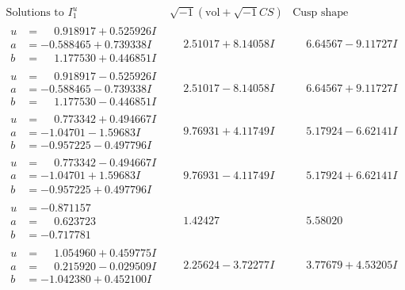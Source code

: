\documentclass[1p]{elsarticle_modified}
\theoremstyle{definition}
\newcommand{\I}{\sqrt{-1}}
\begin{document}
$$\begin{array}{c|c|c}  
\text{Solutions to }I^u_{1}& \I (\text{vol} + \sqrt{-1}CS) & \text{Cusp shape}\\
 \hline 
\begin{aligned}
u &= \phantom{-}0.918917 + 0.525926 I \\
a &= -0.588465 + 0.739338 I \\
b &= \phantom{-}1.177530 + 0.446851 I\end{aligned}
 & \phantom{-}2.51017 + 8.14058 I & \phantom{-}6.64567 - 9.11727 I \\ \hline\begin{aligned}
u &= \phantom{-}0.918917 - 0.525926 I \\
a &= -0.588465 - 0.739338 I \\
b &= \phantom{-}1.177530 - 0.446851 I\end{aligned}
 & \phantom{-}2.51017 - 8.14058 I & \phantom{-}6.64567 + 9.11727 I \\ \hline\begin{aligned}
u &= \phantom{-}0.773342 + 0.494667 I \\
a &= -1.04701 - 1.59683 I \\
b &= -0.957225 - 0.497796 I\end{aligned}
 & \phantom{-}9.76931 + 4.11749 I & \phantom{-}5.17924 - 6.62141 I \\ \hline\begin{aligned}
u &= \phantom{-}0.773342 - 0.494667 I \\
a &= -1.04701 + 1.59683 I \\
b &= -0.957225 + 0.497796 I\end{aligned}
 & \phantom{-}9.76931 - 4.11749 I & \phantom{-}5.17924 + 6.62141 I \\ \hline\begin{aligned}
u &= -0.871157\phantom{ +0.000000I} \\
a &= \phantom{-}0.623723\phantom{ +0.000000I} \\
b &= -0.717781\phantom{ +0.000000I}\end{aligned}
 & \phantom{-}1.42427\phantom{ +0.000000I} & \phantom{-}5.58020\phantom{ +0.000000I} \\ \hline\begin{aligned}
u &= \phantom{-}1.054960 + 0.459775 I \\
a &= \phantom{-}0.215920 - 0.029509 I \\
b &= -1.042380 + 0.452100 I\end{aligned}
 & \phantom{-}2.25624 - 3.72277 I & \phantom{-}3.77679 + 4.53205 I \\ \hline\begin{aligned}

\end{aligned}
\end{array}$$
\end{document}
